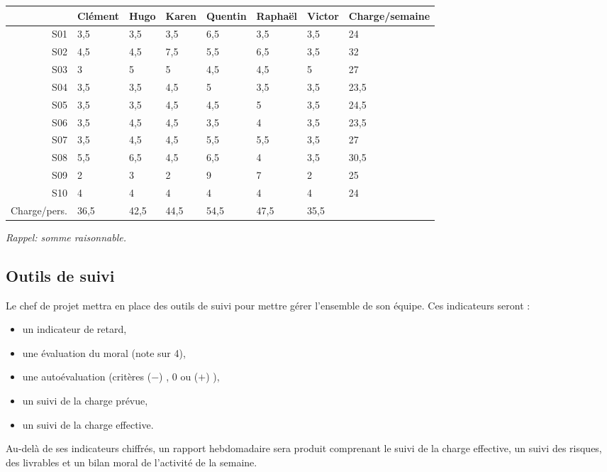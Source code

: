 \begin{longtable}{|r|l|l|l|l|l|l|l|}
\hline
&Clément&Hugo&Karen&Quentin&Raphaël&Victor&Charge/semaine\\
\endhead \hline
S01&3,5&3,5&3,5&6,5&3,5&3,5&24\\
\hline
S02&4,5&4,5&7,5&5,5&6,5&3,5&32\\
\hline
S03&3&5&5&4,5&4,5&5&27\\
\hline
S04&3,5&3,5&4,5&5&3,5&3,5&23,5\\
\hline
S05&3,5&3,5&4,5&4,5&5&3,5&24,5\\
\hline
S06&3,5&4,5&4,5&3,5&4&3,5&23,5\\
\hline
S07&3,5&4,5&4,5&5,5&5,5&3,5&27\\
\hline
S08&5,5&6,5&4,5&6,5&4&3,5&30,5\\
\hline
S09&2&3&2&9&7&2&25\\
\hline
S10&4&4&4&4&4&4&24\\
\hline
Charge/pers.&36,5&42,5&44,5&54,5&47,5&35,5&\\
\hline
\end{longtable}

\textsl{Rappel: somme raisonnable.}

\subsection{Outils de suivi}

Le chef de projet mettra en place des outils de suivi pour mettre
gérer l'ensemble de son équipe. 
Ces indicateurs seront : 
\begin{itemize}
\item un indicateur de retard,
\item une évaluation du moral (note sur 4),
\item une autoévaluation (critères ($-$) , 0 ou ($+$) ),
\item un suivi de la charge prévue,
\item un suivi de la charge effective.
\end{itemize}

Au-delà de ses indicateurs chiffrés, un rapport hebdomadaire sera produit
comprenant le suivi de la charge effective, un suivi des risques, des
livrables et un bilan moral de l'activité de la semaine.
